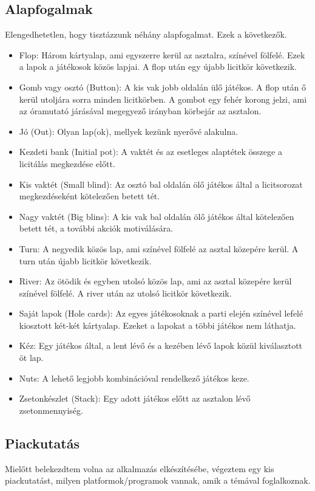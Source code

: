 \subsection{Alapfogalmak}
Elengedhetetlen, hogy tisztázzunk néhány alapfogalmat. Ezek a következők.
\begin{itemize}
\item Flop: Három kártyalap, ami egyszerre kerül az asztalra, színével fölfelé. Ezek a lapok a játékosok közös lapjai. A flop után egy újabb licitkör következik.
\item Gomb vagy osztó (Button): A kis vak jobb oldalán ülő játékos. A flop után ő kerül utoljára sorra minden licitkörben. A gombot egy fehér korong jelzi, ami az óramutató járásával megegyező irányban körbejár az asztalon.
\item Jó (Out): Olyan lap(ok), mellyek kezünk nyerővé alakulna.
\item Kezdeti bank (Initial pot): A vaktét és az esetleges alaptétek összege a licitálás megkezdése előtt.
\item Kis vaktét (Small blind): Az osztó bal oldalán ölő játékos által a licitsorozat megkezdéseként kötelezően betett tét.
\item Nagy vaktét (Big blins): A kis vak bal oldalán ölő játékos által kötelezően betett tét, a további akciók motiválására.
\item Turn: A negyedik közös lap, ami színével fölfelé az asztal közepére kerül. A turn után újabb licitkör következik.
\item River: Az ötödik és egyben utolsó közös lap, ami az asztal közepére kerül színével fölfelé. A river után az utolsó licitkör következik.
\item Saját lapok (Hole cards): Az egyes játékosoknak a parti elején színével lefelé kiosztott két-két kártyalap. Ezeket a lapokat a többi játékos nem láthatja.
\item Kéz: Egy játékos által, a lent lévő és a kezében lévő lapok közül kiválasztott öt lap.
\item Nuts: A lehető legjobb kombinációval rendelkező játékos keze.
\item Zsetonkészlet (Stack): Egy adott játékos előtt az asztalon lévő zsetonmennyiség.
\end{itemize}

\subsection{Piackutatás}
Mielőtt belekezdtem volna az alkalmazás elkészítésébe, végeztem egy kis piackutatást, milyen platformok/programok vannak, amik a témával foglalkoznak.

